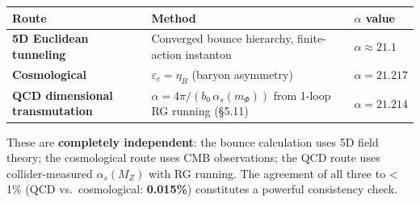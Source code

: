 \documentclass[
  11pt,
]{article}
\begin{document}
\begin{longtable}[]{@{}lll@{}}
\toprule
\begin{minipage}[b]{0.21\columnwidth}\raggedright
Route\strut
\end{minipage} & \begin{minipage}[b]{0.24\columnwidth}\raggedright
Method\strut
\end{minipage} & \begin{minipage}[b]{0.47\columnwidth}\raggedright
\(\alpha\) value\strut
\end{minipage}\tabularnewline
\midrule
\endhead
\begin{minipage}[t]{0.21\columnwidth}\raggedright
\textbf{5D Euclidean tunneling}\strut
\end{minipage} & \begin{minipage}[t]{0.24\columnwidth}\raggedright
Converged bounce hierarchy, finite-action instanton\strut
\end{minipage} & \begin{minipage}[t]{0.47\columnwidth}\raggedright
\(\alpha \approx 21.1\)\strut
\end{minipage}\tabularnewline
\begin{minipage}[t]{0.21\columnwidth}\raggedright
\textbf{Cosmological}\strut
\end{minipage} & \begin{minipage}[t]{0.24\columnwidth}\raggedright
\(\varepsilon_c = \eta_B\) (baryon asymmetry)\strut
\end{minipage} & \begin{minipage}[t]{0.47\columnwidth}\raggedright
\(\alpha = 21.217\)\strut
\end{minipage}\tabularnewline
\begin{minipage}[t]{0.21\columnwidth}\raggedright
\textbf{QCD dimensional transmutation}\strut
\end{minipage} & \begin{minipage}[t]{0.24\columnwidth}\raggedright
\(\alpha = 4\pi/(b_0\,\alpha_s(m_\Phi))\) from 1-loop RG running
(§5.11)\strut
\end{minipage} & \begin{minipage}[t]{0.47\columnwidth}\raggedright
\(\alpha = 21.214\)\strut
\end{minipage}\tabularnewline
\bottomrule
\end{longtable}

These are \textbf{completely independent}: the bounce calculation uses
5D field theory; the cosmological route uses CMB observations; the QCD
route uses collider-measured \(\alpha_s(M_Z)\) with RG running. The
agreement of all three to \textless{} 1\% (QCD vs.~cosmological:
\textbf{0.015\%}) constitutes a powerful consistency check.
\end{document}
